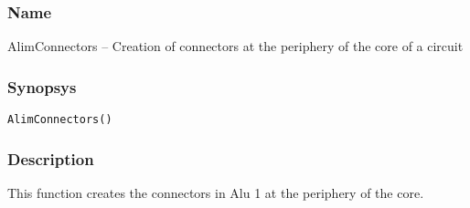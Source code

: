 \subsubsection{Name}

AlimConnectors -- Creation of connectors at the periphery of the core of a circuit

\subsubsection{Synopsys}

\begin{verbatim}
AlimConnectors()
\end{verbatim}

\subsubsection{Description}

This function creates the connectors in Alu 1 at the periphery of the core.
    
  
    
         
\begin{htmlonly}

\end{htmlonly}
